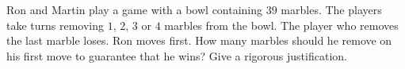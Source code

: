 Ron and Martin play a game with a bowl containing $39$ marbles. The players take turns removing $1$, $2$, $3$ or $4$ marbles from the bowl. The player who removes the last marble loses. Ron moves first. How many marbles should he remove on his first move to guarantee that he wins? Give a rigorous justification.
